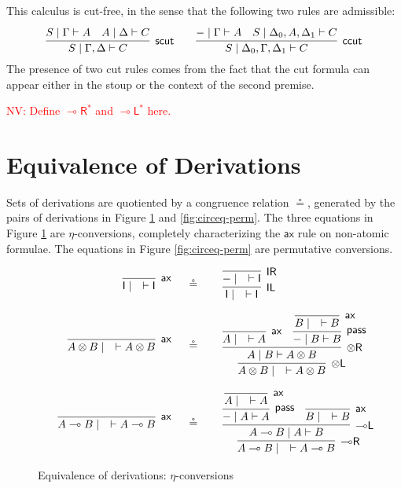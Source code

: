 \documentclass[sn-mathphys-num]{sn-jnl}%
\newcommand{\vd}{\vdash}
\newcommand{\tl}{\otimes \mathsf{L}}
\newcommand{\tr}{\otimes\mathsf{R}}
\newcommand{\pass}{\mathsf{pass}}
\newcommand{\unitl}{\mathsf{IL}}
\newcommand{\unitr}{\mathsf{IR}}
\newcommand{\ax}{\mathsf{ax}}
\newcommand{\ot}{\otimes}
\newcommand{\lolli}{\multimap}
\newcommand{\lleft}{{\lolli}\mathsf{L}}
\newcommand{\lright}{{\lolli}\mathsf{R}}
\newcommand{\unit}{\mathsf{I}}
\newcommand{\proofbox}[1]{\begin{tabular}{l} #1 \end{tabular}}
\newcommand{\niccolo}[1]{\textcolor{red}{NV: #1}}
\theoremstyle{thmstyleone}%
\theoremstyle{thmstyletwo}%
\theoremstyle{thmstylethree}%
\begin{document}
This calculus is cut-free, in the sense that the following two rules are admissible:
\begin{equation}\label{eq:cut}
      \infer[\mathsf{scut}]{S \mid \Gamma , \Delta \vd C}{
        \deduce{S \mid \Gamma \vd A}{}
        &
        \deduce{A \mid \Delta \vd C}{}
      }
      \qquad
      \infer[\mathsf{ccut}]{S \mid \Delta_0 , \Gamma , \Delta_1 \vd C}{
        \deduce{{-} \mid \Gamma \vd A}{}
        &
        \deduce{S \mid \Delta_0 , A , \Delta_1 \vd C}{}
      }
\end{equation}
The presence of two cut rules comes from the fact that the cut formula can appear either in the stoup or the context of the second premise.

\niccolo{Define $\lright^*$ and $\lleft^*$ here.}

\section{Equivalence of Derivations}\label{sec:equiv}

Sets of derivations are quotiented by a congruence relation $\circeq$, generated by the pairs of derivations in Figure \ref{fig:circeqeta} and \ref{fig:circeq-perm}.
The three equations in Figure \ref{fig:circeqeta} are $\eta$-conversions, completely characterizing the $\ax$ rule on non-atomic formulae. The equations in Figure \ref{fig:circeq-perm} are permutative conversions.
\begin{figure}
\begin{displaymath}
\begin{array}{rcl}
    \proofbox{
      \infer[\ax]{\unit \mid \quad \vd \unit}{}
    }
  &\circeq&
  \proofbox{
     \infer[\unitl]{\unit \mid \quad \vd \unit}{
    \infer[\unitr]{{-} \mid \quad \vd \unit}{}
   }
  }
  \\[20pt]
  \proofbox{
    \infer[\ax]{A \ot B \mid \quad \vd A \ot B}{}
  }
  &\circeq&
  \proofbox{
    \infer[\tl]{A \ot B \mid \quad \vd A \ot B}{
      \infer[\tr]{A \mid B \vd A \ot B}{
        \infer[\ax]{A \mid \quad \vd A}{}
        &
        \infer[\pass]{{-} \mid B \vd B}{
          \infer[\ax]{B \mid \quad \vd B}{}
        }
      }
    }
  }
  \\[35pt]
  \proofbox{
    \infer[\ax]{A \lolli B \mid \quad \vd A \lolli B}{}
  }
  &\circeq&
  \proofbox{
    \infer[\lright]{A \lolli B \mid \quad \vd A \lolli B}{
      \infer[\lleft]{A \lolli B \mid A \vd B}{
        \infer[\pass]{{-} \mid A \vd A}{
          \infer[\ax]{A \mid \quad \vd A}{}
        }
        &
        \infer[\ax]{B \mid \quad \vd B}{}
      }
    }
  }
\end{array}
\end{displaymath}
\caption{Equivalence of derivations: $\eta$-conversions}
\label{fig:circeqeta}
\end{figure}
\end{document}
